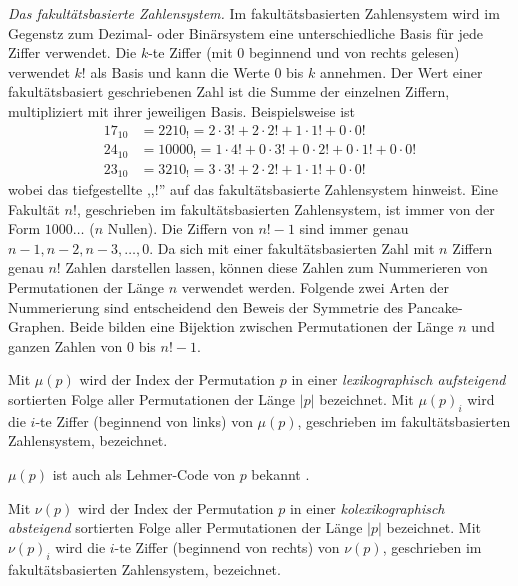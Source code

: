 \documentclass[a4paper, 10pt, ngerman]{article}
\begin{document}
\emph{Das fakultätsbasierte Zahlensystem.} Im fakultätsbasierten Zahlensystem wird im Gegenstz zum Dezimal- oder Binärsystem eine unterschiedliche Basis für jede Ziffer verwendet. Die $k$-te Ziffer (mit 0 beginnend und von rechts gelesen) verwendet $k!$ als Basis und kann die Werte 0 bis $k$ annehmen. Der Wert einer fakultätsbasiert geschriebenen Zahl ist die Summe der einzelnen Ziffern, multipliziert mit ihrer jeweiligen Basis. Beispielsweise ist
\begin{align*}
    17_{10} & = 2210_!   = 2 \cdot 3! + 2 \cdot 2! + 1 \cdot 1! + 0 \cdot 0!             \\
    24_{10} & = 10000_! = 1 \cdot 4! + 0 \cdot 3! + 0 \cdot 2! + 0 \cdot 1! + 0 \cdot 0! \\
    23_{10} & = 3210_!  = 3 \cdot 3! + 2 \cdot 2! + 1 \cdot 1! + 0 \cdot 0!
\end{align*}
wobei das tiefgestellte ,,!'' auf das fakultätsbasierte Zahlensystem hinweist. Eine Fakultät $n!$, geschrieben im fakultätsbasierten Zahlensystem, ist immer von der Form $1000\dots$ ($n$ Nullen). Die Ziffern von $n! - 1$ sind immer genau $n-1, n-2, n-3, \dots, 0$.
Da sich mit einer fakultätsbasierten Zahl mit $n$ Ziffern genau $n!$ Zahlen darstellen lassen, können diese Zahlen zum Nummerieren von Permutationen der Länge $n$ verwendet werden. Folgende zwei Arten der Nummerierung sind entscheidend den Beweis der Symmetrie des Pancake-Graphen. Beide bilden eine Bijektion zwischen Permutationen der Länge $n$ und ganzen Zahlen von 0 bis $n! - 1$.

\begin{definition}
    Mit $\mu(p)$ wird der Index der Permutation $p$ in einer \emph{lexikographisch aufsteigend} sortierten Folge aller Permutationen der Länge $|p|$ bezeichnet. Mit $\mu(p)_i$ wird die $i$-te Ziffer (beginnend von links) von $\mu(p)$, geschrieben im fakultätsbasierten Zahlensystem, bezeichnet.
\end{definition}

$\mu(p)$ ist auch als Lehmer-Code von $p$ bekannt \cite{factorial}.

\begin{definition}
    Mit $\nu(p)$ wird der Index der Permutation $p$ in einer \emph{kolexikographisch absteigend} sortierten Folge aller Permutationen der Länge $|p|$ bezeichnet. Mit $\nu(p)_i$ wird die $i$-te Ziffer (beginnend von rechts) von $\nu(p)$, geschrieben im fakultätsbasierten Zahlensystem, bezeichnet.
\end{definition}
\end{document}
